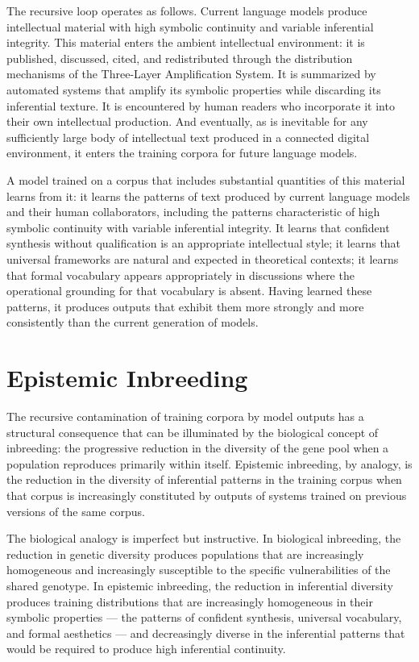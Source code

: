 \documentclass[12pt, openright, twoside]{book}
\begin{document}
The recursive loop operates as follows. Current
language models produce intellectual material with
high symbolic continuity and variable inferential
integrity. This material enters the ambient intellectual
environment: it is published, discussed, cited,
and redistributed through the distribution mechanisms
of the Three-Layer Amplification System. It is
summarized by automated systems that amplify its
symbolic properties while discarding its inferential
texture. It is encountered by human readers who
incorporate it into their own intellectual production.
And eventually, as is inevitable for any sufficiently
large body of intellectual text produced in a connected
digital environment, it enters the training corpora
for future language models.

A model trained on a corpus that includes substantial
quantities of this material learns from it: it learns
the patterns of text produced by current language
models and their human collaborators, including the
patterns characteristic of high symbolic continuity
with variable inferential integrity. It learns that
confident synthesis without qualification is an
appropriate intellectual style; it learns that
universal frameworks are natural and expected
in theoretical contexts; it learns that formal
vocabulary appears appropriately in discussions
where the operational grounding for that vocabulary
is absent. Having learned these patterns, it produces
outputs that exhibit them more strongly and more
consistently than the current generation of models.

\section{Epistemic Inbreeding}

The recursive contamination of training corpora by
model outputs has a structural consequence that
can be illuminated by the biological concept of
inbreeding: the progressive reduction in the
diversity of the gene pool when a population
reproduces primarily within itself. Epistemic
inbreeding, by analogy, is the reduction in the
diversity of inferential patterns in the training
corpus when that corpus is increasingly constituted
by outputs of systems trained on previous versions
of the same corpus.

The biological analogy is imperfect but instructive.
In biological inbreeding, the reduction in genetic
diversity produces populations that are increasingly
homogeneous and increasingly susceptible to the
specific vulnerabilities of the shared genotype.
In epistemic inbreeding, the reduction in inferential
diversity produces training distributions that are
increasingly homogeneous in their symbolic properties
--- the patterns of confident synthesis, universal
vocabulary, and formal aesthetics --- and decreasingly
diverse in the inferential patterns that would be
required to produce high inferential continuity.
\end{document}
